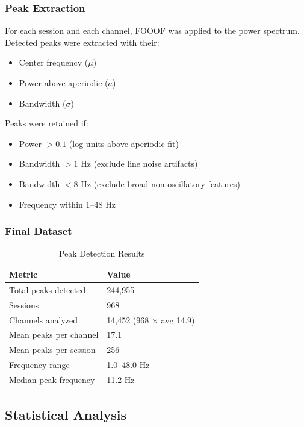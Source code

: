 \documentclass[11pt,a4paper]{article}
\begin{document}
\subsubsection{Peak Extraction}

For each session and each channel, FOOOF was applied to the power spectrum. Detected peaks were extracted with their:

\begin{itemize}
    \item Center frequency ($\mu$)
    \item Power above aperiodic ($a$)
    \item Bandwidth ($\sigma$)
\end{itemize}

Peaks were retained if:
\begin{itemize}
    \item Power $> 0.1$ (log units above aperiodic fit)
    \item Bandwidth $> 1$ Hz (exclude line noise artifacts)
    \item Bandwidth $< 8$ Hz (exclude broad non-oscillatory features)
    \item Frequency within 1--48 Hz
\end{itemize}

\subsubsection{Final Dataset}

\begin{table}[H]
\centering
\caption{Peak Detection Results}
\label{tab:peak_results}
\begin{tabular}{@{}ll@{}}
\toprule
Metric & Value \\
\midrule
Total peaks detected & 244,955 \\
Sessions & 968 \\
Channels analyzed & 14,452 (968 $\times$ avg 14.9) \\
Mean peaks per channel & 17.1 \\
Mean peaks per session & 256 \\
Frequency range & 1.0--48.0 Hz \\
Median peak frequency & 11.2 Hz \\
\bottomrule
\end{tabular}
\end{table}

\subsection{Statistical Analysis}
\end{document}
